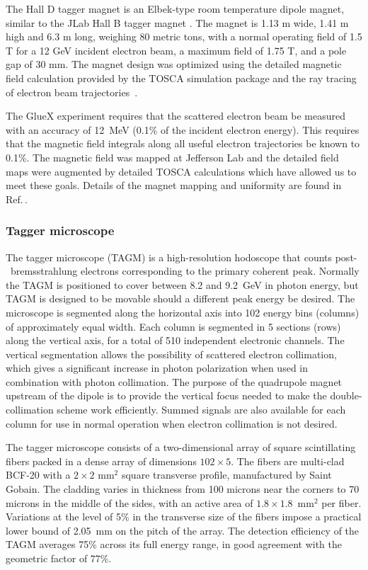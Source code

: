 The Hall D tagger magnet is an Elbek-type room temperature dipole magnet, similar
to the JLab Hall B tagger magnet \cite{BORGGREEN19631, Sober2000263}. 
The magnet is 1.13 m wide, 1.41 m high and 6.3 m long, weighing 80 metric tons,
with a normal operating field of 1.5 T for a  12 GeV incident electron beam, 
a maximum field of 1.75 T, and a pole gap of 30 mm. 
The magnet
design was optimized using the detailed magnetic field calculation  provided by the
TOSCA simulation package and the ray tracing of electron beam trajectories~\cite{DIPOLE_YANG,DIPOLE_SOMOV}.

The GlueX experiment requires that the scattered
electron beam be measured with an accuracy of 12~MeV (0.1\% of the incident electron
energy). This requires that the magnetic field integrals along all useful electron
trajectories be known to 0.1\%. The magnetic field was mapped at Jefferson Lab and
the detailed field maps were augmented by detailed TOSCA calculations which have
allowed us to meet these goals. Details of the magnet mapping and uniformity are
found in Ref.\,\cite{gx4271}.

\subsubsection{Tagger microscope}\label{sec:TAGM}
The tagger microscope (TAGM) is a high-resolution hodoscope that counts post-~\!\!brems\-strah\-lung electrons corresponding to the primary coherent peak.
Normally the TAGM is positioned to cover between 8.2 and 9.2~GeV in photon energy, but TAGM is designed to be movable should a different peak energy be desired.
The microscope is segmented along the horizontal axis into 102 energy bins (columns) of approximately equal width. Each column is segmented 
in 5 sections (rows) along the vertical axis, for a total of 510 independent electronic
channels. The vertical segmentation allows the possibility of scattered electron
collimation, which gives a significant increase in photon polarization when used in
combination with photon collimation. The purpose of the quadrupole magnet upstream
of the dipole is to provide the vertical focus needed to make the
double-collimation scheme work efficiently. Summed signals are also available for
each column for use in normal operation when electron collimation is not desired.

The tagger microscope consists of a two-dimensional array of square scintillating
fibers packed in a dense array of dimensions $102\times 5$. The fibers are multi-clad
BCF-20 with a $2\times 2$ mm$^2$ square transverse profile, manufactured by Saint Gobain.
The cladding varies in thickness from 100 microns near the corners to 70 microns in
the middle of the sides, with an active area of $1.8\times 1.8$~mm$^2$ per fiber.
Variations at the level of 5\% in the transverse size of the fibers impose a practical
lower bound of 2.05~mm on the pitch of the array. The detection efficiency of the TAGM
averages 75\% across its full energy range, in good agreement with the geometric
factor of 77\%.

